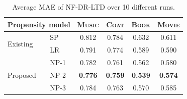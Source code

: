 \documentclass[letterpaper]{article} %
\begin{document}
\begin{table}[h]
\small
\centering
\caption{Average MAE of NF-DR-LTD over 10 different runs.}
\label{tab:mae ablation studies}
\begin{tabular}{l|l|cc||cc}
\toprule
\multicolumn{2}{c|}{Propensity model} & \textsc{Music} & \textsc{Coat} & \textsc{Book} & \textsc{Movie} \\
\midrule
\multirow{2}{*}{Existing} & SP & 0.812 & 0.784 & 0.632 & 0.611 \\
& LR & 0.791 & 0.774 & 0.589 & 0.590 \\
\midrule
\multirow{3}{*}{Proposed} & NP-1 & 0.782 & 0.761 & 0.562 & 0.580 \\
& NP-2 & \textbf{0.776} & \textbf{0.759} & \textbf{0.539} & \textbf{0.574} \\
& NP-3 & 0.784 & 0.763 & 0.570 & 0.585 \\
\bottomrule
\end{tabular}
\end{table}
\end{document}
